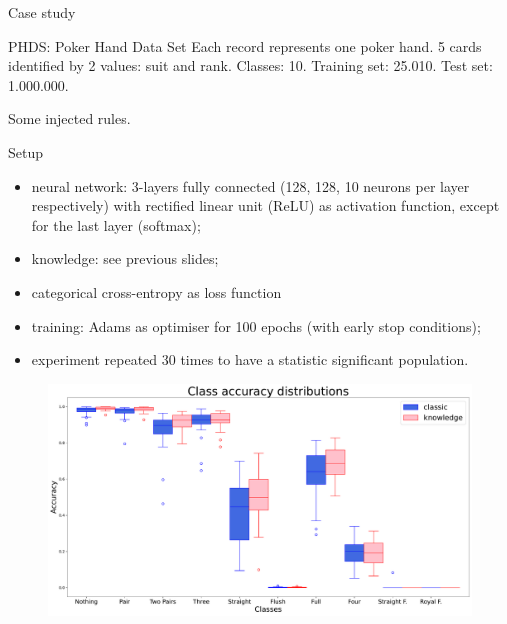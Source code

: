 \documentclass[presentation]{beamer}\mode<presentation>{\usetheme{AMSBolognaFC}}
\begin{document}
\begin{frame}[allowframebreaks]{Case study}
    
     \begin{block}{PHDS: Poker Hand Data Set}
        Each record represents one poker hand. 5 cards identified by 2 values: suit and rank.
        Classes: 10.
        Training set: 25.010. Test set: 1.000.000.
    \end{block}
    
    
    
    \framebreak
    
    Some injected rules.
    
    
    \framebreak
    
    \begin{block}{Setup}
        \begin{itemize}
            \item neural network: 3-layers fully connected (128, 128, 10 neurons per layer respectively) with rectified linear unit (ReLU) as activation function, except for the last layer (softmax);
            \item knowledge: see previous slides;
            \item categorical cross-entropy as loss function
            \item training: Adams as optimiser for 100 epochs (with early stop conditions);
            \item experiment repeated 30 times to have a statistic significant population.
        \end{itemize}
    \end{block}
    
    \framebreak
    
    
    
     \framebreak
    
    \begin{figure}
        \centering
        \includegraphics[width=.8\linewidth]{figures/class-accuracy-distributions.pdf}
    \end{figure}
    
\end{frame}
\end{document}
